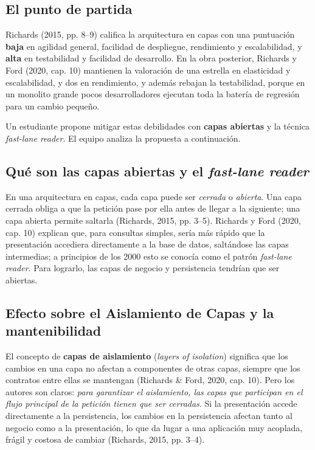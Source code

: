 \documentclass[11pt,a4paper]{article}
\begin{document}
\subsection{El punto de partida}

Richards (2015, pp. 8--9) califica la arquitectura en capas con una puntuación \textbf{baja} en agilidad general, facilidad de despliegue, rendimiento y escalabilidad, y \textbf{alta} en testabilidad y facilidad de desarrollo. En la obra posterior, Richards y Ford (2020, cap. 10) mantienen la valoración de una estrella en elasticidad y escalabilidad, y dos en rendimiento, y además rebajan la testabilidad, porque en un monolito grande pocos desarrolladores ejecutan toda la batería de regresión para un cambio pequeño.

Un estudiante propone mitigar estas debilidades con \textbf{capas abiertas} y la técnica \emph{fast-lane reader}. El equipo analiza la propuesta a continuación.

\subsection{Qué son las capas abiertas y el \emph{fast-lane reader}}

En una arquitectura en capas, cada capa puede ser \emph{cerrada} o \emph{abierta}. Una capa cerrada obliga a que la petición pase por ella antes de llegar a la siguiente; una capa abierta permite saltarla (Richards, 2015, pp. 3--5). Richards y Ford (2020, cap. 10) explican que, para consultas simples, sería más rápido que la presentación accediera directamente a la base de datos, saltándose las capas intermedias; a principios de los 2000 esto se conocía como el patrón \emph{fast-lane reader}. Para lograrlo, las capas de negocio y persistencia tendrían que ser abiertas.

\subsection{Efecto sobre el Aislamiento de Capas y la mantenibilidad}

El concepto de \textbf{capas de aislamiento} (\emph{layers of isolation}) significa que los cambios en una capa no afectan a componentes de otras capas, siempre que los contratos entre ellas se mantengan (Richards \& Ford, 2020, cap. 10). Pero los autores son claros: \emph{para garantizar el aislamiento, las capas que participan en el flujo principal de la petición tienen que ser cerradas}. Si la presentación accede directamente a la persistencia, los cambios en la persistencia afectan tanto al negocio como a la presentación, lo que da lugar a una aplicación muy acoplada, frágil y costosa de cambiar (Richards, 2015, pp. 3--4).
\end{document}
